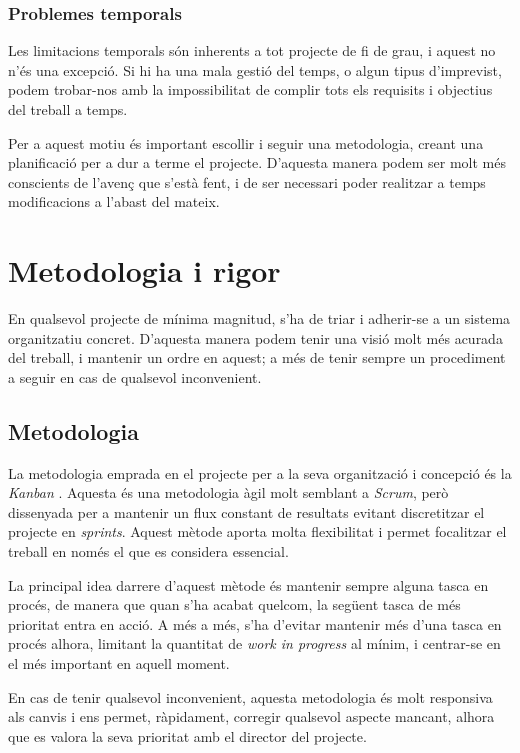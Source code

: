 \documentclass[a4paper]{report}
\begin{document}
	\subsubsection{Problemes temporals}
	Les limitacions temporals són inherents a tot projecte de fi de grau, i aquest no n'és una excepció. Si hi ha una mala gestió del temps, o algun tipus d'imprevist, podem trobar-nos amb la impossibilitat de complir tots els requisits i objectius del treball a temps. \par
	Per a aquest motiu és important escollir i seguir una metodologia, creant una planificació per a dur a terme el projecte. D'aquesta manera podem ser molt més conscients de l'avenç que s'està fent, i de ser necessari poder realitzar a temps modificacions a l'abast del mateix.
	
	\section{Metodologia i rigor}
	En qualsevol projecte de mínima magnitud, s'ha de triar i adherir-se a un sistema organitzatiu concret. D'aquesta manera podem tenir una visió molt més acurada del treball, i mantenir un ordre en aquest; a més de tenir sempre un procediment a seguir en cas de qualsevol inconvenient.
	\subsection{Metodologia}
	La metodologia emprada en el projecte per a la seva organització i concepció és la \textit{Kanban} \cite{Anderson2010}. Aquesta és una metodologia àgil molt semblant a \textit{Scrum}, però dissenyada per a mantenir un flux constant de resultats evitant discretitzar el projecte en \textit{sprints}. Aquest mètode aporta molta flexibilitat i permet focalitzar el treball en només el que es considera essencial.
	\par
	La principal idea darrere d'aquest mètode és mantenir sempre alguna tasca en procés, de manera que quan s'ha acabat quelcom, la següent tasca de més prioritat entra en acció. A més a més, s'ha d'evitar mantenir més d'una tasca en procés alhora, limitant la quantitat de \textit{work in progress} al mínim, i centrar-se en el més important en aquell moment.
	\par
	En cas de tenir qualsevol inconvenient, aquesta metodologia és molt responsiva als canvis i ens permet, ràpidament, corregir qualsevol aspecte mancant, alhora que es valora la seva prioritat amb el director del projecte.
	
\end{document}

